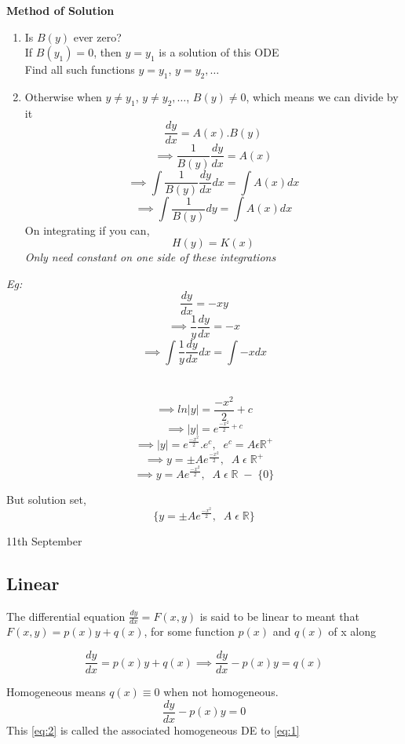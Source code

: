 \documentclass[11pt]{article}
\theoremstyle{definition}
\newcommand{\R}{\mathbb{R}}
\begin{document}
\textbf{Method of Solution}
\begin{enumerate}
    \item Is $B(y)$ ever zero? \\
    If $B(y_1) = 0$, then $y = y_1$ is a solution of this ODE\\
    Find all such functions $y = y_1$, $y = y_2, \dots$
    \item Otherwise when $y \neq y_1$, $y \neq y_2, \dots$, $B(y) \neq 0$, which means we can divide by it
    $$\frac{dy}{dx} = A(x).B(y)$$
    $$\implies \frac{1}{B(y)}\frac{dy}{dx} = A(x)$$
    $$\implies \int \frac{1}{B(y)}\frac{dy}{dx} dx = \int A(x) dx$$
    $$\implies \int \frac{1}{B(y)}dy = \int A(x) dx$$
    On integrating if you can,
    $$H(y) = K(x)$$
    \textit{Only need constant on one side of these integrations}

\end{enumerate}
\textit{Eg:} $$\frac{dy}{dx} = -xy$$
    $$\implies \frac{1}{y}\frac{dy}{dx} = -x$$
    $$\implies \int \frac{1}{y}\frac{dy}{dx} dx = \int -x dx$$\\\\
    $$\implies ln|y| = \frac{-x^2}{2} + c$$
    $$\implies |y| = e^{\frac{-x^2}{2} + c}$$
    $$\implies |y| = e^{\frac{-x^2}{2}}.e^c,\;\; e^c = A \epsilon \R^+$$
    $$\implies y = \pm Ae^{\frac{-x^2}{2}},\;\; A\; \epsilon\; \R^+$$
    $$\implies y = Ae^{\frac{-x^2}{2}},\;\; A\; \epsilon\; \R\; -\; \{0\}$$

    But solution set,
    $$\{y = \pm Ae^{\frac{-x^2}{2}},\;\; A\; \epsilon\; \R\}$$


\newpage

\begin{center}
{\LARGE 11th September}\\
\end{center}

\subsection{Linear}
The differential equation $\frac{dy}{dx} = F(x,y)$ is said to be linear to meant that $F(x,y) = p(x)y + q(x)$, for some function $p(x)$ and $q(x)$ of x along

\begin{equation} \label{eq:1}
\frac{dy}{dx} = p(x)y + q(x) \implies \frac{dy}{dx} - p(x)y = q(x)
\end{equation}

Homogeneous means $q(x) \equiv 0$ when not homogeneous.
\begin{equation} \label{eq:2}
\frac{dy}{dx} - p(x)y = 0
\end{equation}
This \ref{eq:2} is called the associated homogeneous DE to \ref{eq:1}
\end{document}
